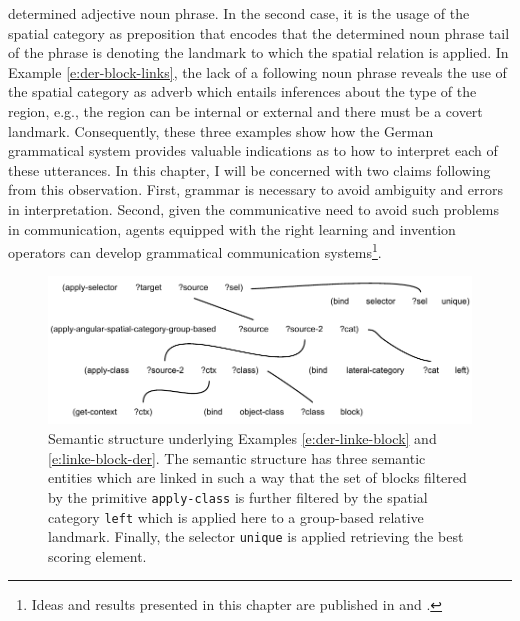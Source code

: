 determined adjective noun phrase. In the second case, it is the usage of the spatial
category as preposition that encodes that the determined noun phrase tail of the phrase
is denoting the landmark to which the spatial relation is applied. 
In Example \ref{e:der-block-links}, the lack of a following noun phrase reveals the use of the spatial category as 
adverb which entails inferences about the type of the region, e.g., the region can be internal or external 
and there must be a covert landmark. Consequently, these three examples show how the German grammatical 
system provides valuable indications as to how to interpret each of these utterances.
In this chapter, I will be concerned with two claims following from this observation. First,
grammar is necessary to avoid ambiguity and errors in interpretation. Second, given the
communicative need to avoid such problems in communication, agents equipped with
the right learning and invention operators can develop grammatical communication systems\footnote{Ideas and results presented in this chapter are 
published in \citep{spranger2012grammar} and \citep{spranger2010space}.}.


\begin{figure}
\begin{center}
\includegraphics[width=1.0\columnwidth]{figs/semantic-structure-der-linke-block}
\end{center}
\caption[Semantic structure example spatial adjective]{Semantic structure underlying Examples \ref{e:der-linke-block} and \ref{e:linke-block-der}. 
The semantic structure has three semantic entities which are linked in such a way that
the set of blocks filtered by the primitive {\footnotesize\tt apply-class} is further
filtered by the spatial category {\footnotesize\tt left} which is applied here to a group-based 
relative landmark. Finally, the selector {\footnotesize\tt unique} is applied retrieving the 
best scoring element.}
\label{f:semantic-structure-1}
\end{figure}

